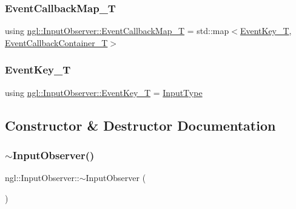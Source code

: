 \mbox{\label{classngl_1_1_input_observer_af68ba9cdd29ed56f5f7aa85a36a45258}} 
\subsubsection{\texorpdfstring{Event\+Callback\+Map\+\_\+T}{EventCallbackMap\_T}}
{\footnotesize\ttfamily using \mbox{\hyperlink{classngl_1_1_input_observer_af68ba9cdd29ed56f5f7aa85a36a45258}{ngl\+::\+Input\+Observer\+::\+Event\+Callback\+Map\+\_\+T}} =  std\+::map$<$\mbox{\hyperlink{namespacengl_a5b20ff50635da5e3adb6bec00c062497}{Event\+Key\+\_\+T}}, \mbox{\hyperlink{classngl_1_1_input_observer_a42a0cd74782142e52f888e27aacef6f9}{Event\+Callback\+Container\+\_\+T}}$>$}

\mbox{\label{classngl_1_1_input_observer_a1bf696a9f5570f16f2b2b19411eeae29}} 
\subsubsection{\texorpdfstring{Event\+Key\+\_\+T}{EventKey\_T}}
{\footnotesize\ttfamily using \mbox{\hyperlink{namespacengl_a5b20ff50635da5e3adb6bec00c062497}{ngl\+::\+Input\+Observer\+::\+Event\+Key\+\_\+T}} =  \mbox{\hyperlink{namespacengl_a5b20ff50635da5e3adb6bec00c062497}{Input\+Type}}}



\subsection{Constructor \& Destructor Documentation}
\mbox{\label{classngl_1_1_input_observer_a0a1424516ca191ec125d99c7b49eea89}} 
\subsubsection{\texorpdfstring{$\sim$\+Input\+Observer()}{~InputObserver()}}
{\footnotesize\ttfamily ngl\+::\+Input\+Observer\+::$\sim$\+Input\+Observer (\begin{DoxyParamCaption}{ }\end{DoxyParamCaption})\hspace{0.3cm}{\ttfamily [virtual]}}

